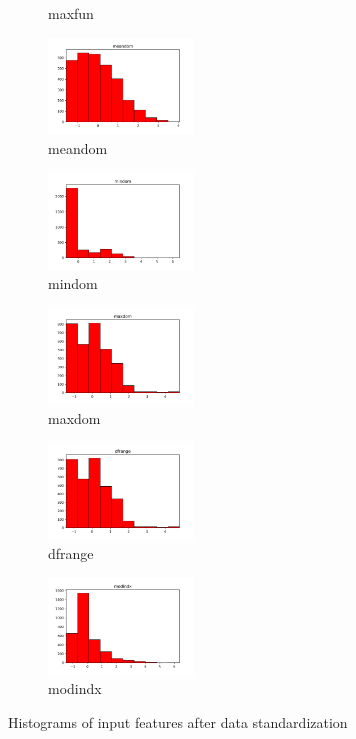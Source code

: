 \documentclass[a4paper]{article}    %
\begin{document}
\begin{figure}[H]
\begin{subfigure}{0.32\textwidth}
        \caption{maxfun}
        \label{fig:sub_std_14}
    \end{subfigure}\hfill
    \begin{subfigure}{0.32\textwidth}
        \centering
        \includegraphics[width=3.85cm]{std_14_meandom}
        \caption{meandom}
        \label{fig:sub_std_15}
    \end{subfigure}\hfill
    \begin{subfigure}{0.32\textwidth}
        \centering
        \includegraphics[width=3.85cm]{std_15_mindom}
        \caption{mindom}
        \label{fig:sub_std_16}
    \end{subfigure}\hfill
    \begin{subfigure}{0.32\textwidth}
        \centering
        \includegraphics[width=3.85cm]{std_16_maxdom}
        \caption{maxdom}
        \label{fig:sub_std_17}
    \end{subfigure}\hfill
    \begin{subfigure}{0.32\textwidth}
        \centering
        \includegraphics[width=3.85cm]{std_17_dfrange}
        \caption{dfrange}
        \label{fig:sub_std_18}
    \end{subfigure}\hfill
    \begin{subfigure}{0.32\textwidth}
        \centering
        \includegraphics[width=3.85cm]{std_18_modindx}
        \caption{modindx}
        \label{fig:sub_std_19}
    \end{subfigure}
    \caption{Histograms of input features after data standardization}
    \label{fig:pre-ex1-std_histograms}
\end{figure}
\end{document}
